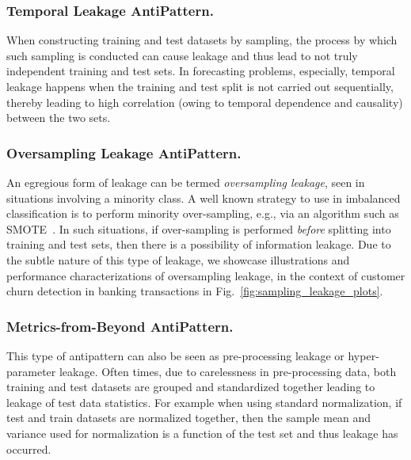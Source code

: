 \subsubsection{\bf Temporal Leakage AntiPattern.}
When constructing training and test datasets by sampling, the process
by which such sampling
is conducted can cause
leakage and thus lead to
not truly independent
training and test
sets.
In forecasting
problems, especially,
temporal leakage happens
when the training and
test split is not
carried out sequentially, thereby leading to high correlation (owing to temporal dependence and causality) between the two sets. 
    
\subsubsection{\bf Oversampling Leakage AntiPattern.}
An egregious form of leakage can be
termed \emph{oversampling leakage}, seen in situations involving a minority class. A well known strategy to use in imbalanced classification is to perform minority over-sampling, e.g., via an algorithm such as SMOTE~\cite{smote}. In such situations, if over-sampling is performed {\it before} splitting into training and test sets, then there is a possibility of information leakage. Due to the subtle nature of this type of leakage, we showcase illustrations and performance characterizations of oversampling leakage, in the context of customer churn detection in banking transactions in Fig.~\ref{fig:sampling_leakage_plots}. 

\subsubsection{\bf Metrics-from-Beyond AntiPattern.} 
This type of antipattern
can also be seen as
pre-processing leakage or
hyper-parameter leakage.
Often times, due to carelessness in pre-processing data, both training and test datasets are grouped and standardized together leading to leakage of test data statistics. For example when using standard normalization, if test and train datasets are normalized together, then the  sample mean and variance used for normalization is a function of the test set and thus
leakage has occurred.
